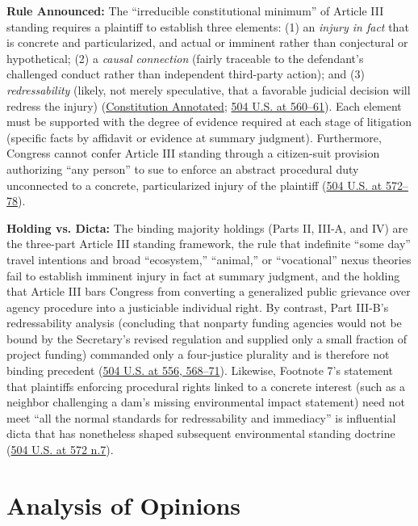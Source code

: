 \documentclass[12pt]{article}
\begin{document}
\textbf{Rule Announced:} The ``irreducible constitutional minimum'' of Article III standing requires a plaintiff to establish three elements: (1) an \textit{injury in fact} that is concrete and particularized, and actual or imminent rather than conjectural or hypothetical; (2) a \textit{causal connection} (fairly traceable to the defendant's challenged conduct rather than independent third-party action); and (3) \textit{redressability} (likely, not merely speculative, that a favorable judicial decision will redress the injury) (\href{https://www.law.cornell.edu/constitution-conan/article-3/section-2/clause-1/overview-of-the-lujan-test}{Constitution Annotated}; \href{https://supreme.justia.com/cases/federal/us/504/555/}{504 U.S. at 560--61}). Each element must be supported with the degree of evidence required at each stage of litigation (specific facts by affidavit or evidence at summary judgment). Furthermore, Congress cannot confer Article III standing through a citizen-suit provision authorizing ``any person'' to sue to enforce an abstract procedural duty unconnected to a concrete, particularized injury of the plaintiff (\href{https://supreme.justia.com/cases/federal/us/504/555/}{504 U.S. at 572--78}).

\textbf{Holding vs. Dicta:} The binding majority holdings (Parts II, III-A, and IV) are the three-part Article III standing framework, the rule that indefinite ``some day'' travel intentions and broad ``ecosystem,'' ``animal,'' or ``vocational'' nexus theories fail to establish imminent injury in fact at summary judgment, and the holding that Article III bars Congress from converting a generalized public grievance over agency procedure into a justiciable individual right. By contrast, Part III-B's redressability analysis (concluding that nonparty funding agencies would not be bound by the Secretary's revised regulation and supplied only a small fraction of project funding) commanded only a four-justice plurality and is therefore not binding precedent (\href{https://supreme.justia.com/cases/federal/us/504/555/}{504 U.S. at 556, 568--71}). Likewise, Footnote 7's statement that plaintiffs enforcing procedural rights linked to a concrete interest (such as a neighbor challenging a dam's missing environmental impact statement) need not meet ``all the normal standards for redressability and immediacy'' is influential dicta that has nonetheless shaped subsequent environmental standing doctrine (\href{https://supreme.justia.com/cases/federal/us/504/555/}{504 U.S. at 572 n.7}).

\section{Analysis of Opinions}
\end{document}
